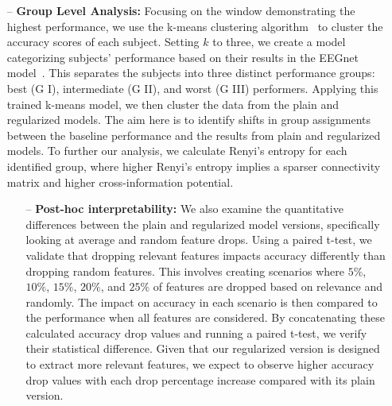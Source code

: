 \begin{itemize}
    \item[--] \textbf{Group Level Analysis:} Focusing on the window demonstrating the highest performance, we use the k-means clustering algorithm~\cite{geron2022hands} to cluster the accuracy scores of each subject. Setting $k$ to three, we create a model categorizing subjects' performance based on their results in the EEGnet model~\cite{lawhern2018eegnet}. This separates the subjects into three distinct performance groups: best (G I), intermediate (G II), and worst (G III) performers. Applying this trained k-means model, we then cluster the data from the plain and regularized models. The aim here is to identify shifts in group assignments between the baseline performance and the results from plain and regularized models. To further our analysis, we calculate Renyi's entropy for each identified group, where higher Renyi's entropy implies a sparser connectivity matrix and higher cross-information potential. 
    \begin{itemize}
        \item[--] \textbf{Post-hoc interpretability:} We also examine the quantitative differences between the plain and regularized model versions, specifically looking at average and random feature drops. Using a paired t-test, we validate that dropping relevant features impacts accuracy differently than dropping random features. This involves creating scenarios where $5\%$, $10\%$, $15\%$, $20\%$, and $25\%$ of features are dropped based on relevance and randomly. The impact on accuracy in each scenario is then compared to the performance when all features are considered. By concatenating these calculated accuracy drop values and running a paired t-test, we verify their statistical difference. Given that our regularized version is designed to extract more relevant features, we expect to observe higher accuracy drop values with each drop percentage increase compared with its plain version.


\end{itemize}
\end{itemize}
